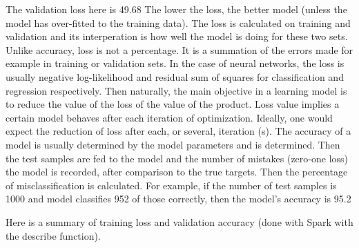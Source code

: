 \documentclass{acmtog} %
\begin{document}
The validation loss here is 49.68%
The lower the loss, the better model (unless the model has over-fitted to the training data). The loss is calculated on training and validation and its interperation is how well the model is doing for these two sets. Unlike accuracy, loss is not a percentage. It is a summation of the errors made for example in training or validation sets.
In the case of neural networks, the loss is usually negative log-likelihood and residual sum of squares for classification and regression respectively. Then naturally, the main objective in a learning model is to reduce the value of the loss of the value of the product.
Loss value implies a certain model behaves after each iteration of optimization. Ideally, one would expect the reduction of loss after each, or several, iteration (s).
The accuracy of a model is usually determined by the model parameters and is determined. Then the test samples are fed to the model and the number of mistakes (zero-one loss) the model is recorded, after comparison to the true targets. Then the percentage of misclassification is calculated.
For example, if the number of test samples is 1000 and model classifies 952 of those correctly, then the model's accuracy is 95.2%

Here is a summary of training loss and validation accuracy (done with Spark with the describe function).


\begin{table}[H]
\label{tab:training_loss_a}
\end{table}


\begin{table}[H]
\label{tab:valid_loss_b}
\end{table}
\end{document}

